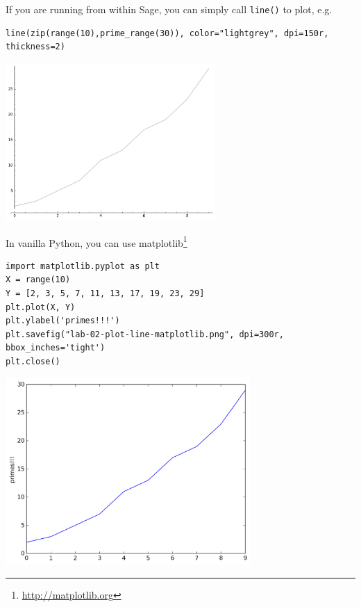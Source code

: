 \documentclass[10pt,a4paper,nobib]{tufte-handout}
\begin{document}
If you are running from within Sage, you can simply call \texttt{line()} to plot, e.g. 

\lstset{language=sage,label= ,caption= ,captionpos=b,numbers=none}
\begin{lstlisting}
line(zip(range(10),prime_range(30)), color="lightgrey", dpi=150r, thickness=2)
\end{lstlisting}

\begin{center}
\includegraphics[width=0.6\textwidth]{lab-02-plot-line-sage.png}
\end{center}

In vanilla Python, you can use matplotlib\footnote{\url{http://matplotlib.org}}

\lstset{language=sage,label= ,caption= ,captionpos=b,numbers=none}
\begin{lstlisting}
import matplotlib.pyplot as plt
X = range(10)
Y = [2, 3, 5, 7, 11, 13, 17, 19, 23, 29]
plt.plot(X, Y)
plt.ylabel('primes!!!')
plt.savefig("lab-02-plot-line-matplotlib.png", dpi=300r, bbox_inches='tight')
plt.close()
\end{lstlisting}

\begin{center}
\includegraphics[width=0.7\textwidth]{./lab-02-plot-line-matplotlib.png}
\end{center} 
\end{document}

